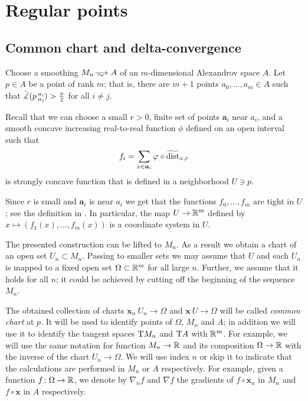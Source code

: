\section{Regular points}\label{sec:ref}

\subsection{Common chart and delta-convergence}

Choose a smoothing $M_n\smooths{} A$ of an $m$-dimensional Alexandrov space $A$.
Let $p\in A$ be a point of rank $m$; that is, there are $m+1$ points $a_0,\dots, a_m\in A$ such that 
$\tilde\measuredangle(p\,{}^{a_i}_{a_j}\hspace{-0.2ex})>\tfrac\pi2$ for all $i\ne j$.

Recall \cite[Sec. 7]{petrunin-conc} that we can choose a small $r>0$,
finite set of points $\bm{a}_i$ near $a_i$,
and a smooth concave increasing real-to-real function $\phi$ defined on an open interval such that 
\[f_i=\sum_{x\in \bm{a}_i}\varphi\circ\widetilde{\operatorname{\rm dist}}_{x,r}\]
is strongly concave function that is defined in a neighborhood $U\ni p$.

Since $r$ is small and $\bm{a}_i$ is near $a_i$ we get that the functions $f_0, \dots, f_m$ are tight in $U$; see the definition in \cite{petrunin-conc}.
In particular, the map $U\to\mathbb{R}^m$ defined by $x\mapsto (f_1(x),\dots,f_m(x))$ is a coordinate system in $U$.

The presented construction can be lifted to $M_n$.
As a result we obtain a chart of an open set $U_n\subset M_n$.
Passing to smaller sets we may assume that $U$ and each $U_n$ is mapped to a fixed open set $\Omega\subset\mathbb{R}^m$ for all large $n$.
Further, we assume that it holds for all $n$; it could be achieved by cutting off the beginning of the sequence $M_n$.

The obtained collection of charts $\bm{x}_n\:U_n\to \Omega$ and $\bm{x}\:U\to \Omega$ will be called \emph{common chart} at $p$.
It will be used to identify points of $\Omega$, $M_n$ and $A$; 
in addition we will use it to identify the tangent spaces $\mathrm{T} M_n$ and $\mathrm{T} A$ with $\mathbb{R}^m$.
For example, we will use the same notation for function $M_n\to \mathbb{R}$ and its composition $\Omega\to \mathbb{R}$ with the inverse of the chart $U_n\to \Omega$.
We will use index $n$ or skip it to indicate that the calculations are performed in $M_n$ or $A$ respectively.
For example, given a function $f\colon\Omega\to \mathbb{R}$, we denote by $\nabla_nf$ and $\nabla f$ the gradients of $f\circ \bm{x}_n$ in $M_n$ and $f\circ \bm{x}$ in $A$ respectively.

